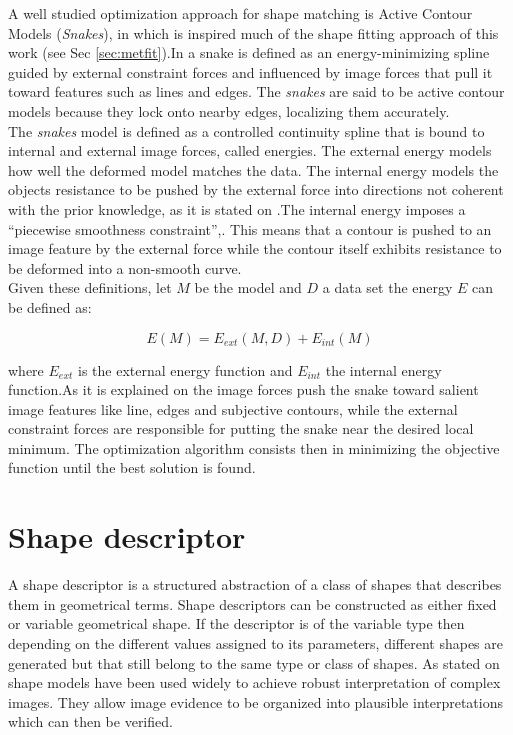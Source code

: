 A well studied optimization approach for shape matching is
Active Contour Models (\emph{Snakes}), in which is inspired much 
of the shape fitting approach of this work 
(see Sec \ref{sec:metfit}).In \cite{snakes} a snake is defined 
as an energy-minimizing spline guided by external constraint
forces and influenced by image forces that pull it toward 
features such as lines and edges. The \emph{snakes} are said to
be active contour models because they lock onto nearby edges,
localizing them accurately.\\
The \emph{snakes} model is defined as a controlled continuity spline that is bound
to internal and external image forces, called energies. The external energy models how well
the deformed model matches the data. The internal energy models
the objects resistance to be pushed by the external force into directions not coherent
with the prior knowledge, as it is stated on \cite{deformable}.The internal energy  imposes 
a ``piecewise smoothness constraint'',\cite{snakes}. This means that a contour is
pushed to an image feature by the external force while the contour itself exhibits resistance
to be deformed into a non-smooth curve. \\

Given these definitions, let $M$ be the model and $D$ a data set
the energy $E$ can be defined as:

$$E(M) = E_{ext}(M,D) + E_{int}(M)$$

where $E_{ext}$ is the external energy function and $E_{int}$ the 
internal energy function.As it is explained on \cite{deformable} the image forces push the snake toward
salient image features like line, edges and subjective contours, while the external constraint forces
are responsible for putting the snake near the desired local minimum.
The optimization algorithm consists then in minimizing the objective
function until the best solution is found.


\section{Shape descriptor}
\label{sec:shapedesc}

A shape descriptor is a structured abstraction of a class
of shapes that describes them in geometrical terms.
Shape descriptors can be constructed as either fixed or variable
geometrical shape. If the descriptor is of the variable type 
then depending on the different values assigned to its
parameters, different shapes are generated
but that still belong to the same type or class of shapes.
As stated on \cite{wormparam}
shape models have been used widely to achieve robust interpretation of complex
images. They allow image evidence to be organized into plausible interpretations
which can then be verified.\\

